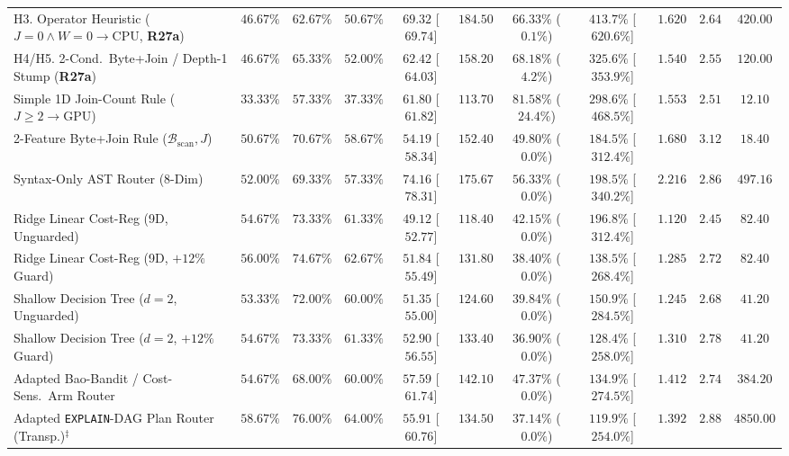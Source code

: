 \documentclass[10pt,a4paper]{article}
\newenvironment{fitasttable}{%
  \begin{lrbox}{\asttblbox}%
}{%
  \end{lrbox}%
  \sbox{\asttblboxB}{%
    \ifdim\wd\asttblbox>0.96\textwidth
      \resizebox{0.96\textwidth}{!}{\usebox{\asttblbox}}%
    \else
      \usebox{\asttblbox}%
    \fi
  }%
  \ifdim\ht\asttblboxB>0.72\textheight
    \resizebox{!}{0.72\textheight}{\usebox{\asttblboxB}}%
  \else
    \usebox{\asttblboxB}%
  \fi
}
\begin{document}
\begin{table}[!htbp]
\begin{fitasttable}
\begin{tabular}{@{}lcccccccccc@{}}
H3. Operator Heuristic ($J=0\wedge W=0\rightarrow\text{CPU}$, \textbf{R27a}) & $46.67\%$ & $62.67\%$ & $50.67\%$ & $69.32$ [$69.74$] & $184.50$ & $66.33\%$ ($0.1\%$) & $413.7\%$ [$620.6\%$] & $1.620$ & $2.64$ & $420.00$ \\
H4/H5. 2-Cond.\ Byte+Join / Depth-1 Stump (\textbf{R27a}) & $46.67\%$ & $65.33\%$ & $52.00\%$ & $62.42$ [$64.03$] & $158.20$ & $68.18\%$ ($4.2\%$) & $325.6\%$ [$353.9\%$] & $1.540$ & $2.55$ & $120.00$ \\
Simple 1D Join-Count Rule ($J \ge 2 \rightarrow \text{GPU}$) & $33.33\%$ & $57.33\%$ & $37.33\%$ & $61.80$ [$61.82$] & $113.70$ & $81.58\%$ ($24.4\%$) & $298.6\%$ [$468.5\%$] & $1.553$ & $2.51$ & $12.10$ \\
2-Feature Byte+Join Rule ($\mathcal{B}_{\text{scan}}, J$) & $50.67\%$ & $70.67\%$ & $58.67\%$ & $54.19$ [$58.34$] & $152.40$ & $49.80\%$ ($0.0\%$) & $184.5\%$ [$312.4\%$] & $1.680$ & $3.12$ & $18.40$ \\
Syntax-Only AST Router (8-Dim) & $52.00\%$ & $69.33\%$ & $57.33\%$ & $74.16$ [$78.31$] & $175.67$ & $56.33\%$ ($0.0\%$) & $198.5\%$ [$340.2\%$] & $2.216$ & $2.86$ & $497.16$ \\
Ridge Linear Cost-Reg (9D, Unguarded) & $54.67\%$ & $73.33\%$ & $61.33\%$ & $49.12$ [$52.77$] & $118.40$ & $42.15\%$ ($0.0\%$) & $196.8\%$ [$312.4\%$] & $1.120$ & $2.45$ & $82.40$ \\
Ridge Linear Cost-Reg (9D, $+12\%$ Guard) & $56.00\%$ & $74.67\%$ & $62.67\%$ & $51.84$ [$55.49$] & $131.80$ & $38.40\%$ ($0.0\%$) & $138.5\%$ [$268.4\%$] & $1.285$ & $2.72$ & $82.40$ \\
Shallow Decision Tree ($d=2$, Unguarded) & $53.33\%$ & $72.00\%$ & $60.00\%$ & $51.35$ [$55.00$] & $124.60$ & $39.84\%$ ($0.0\%$) & $150.9\%$ [$284.5\%$] & $1.245$ & $2.68$ & $41.20$ \\
Shallow Decision Tree ($d=2$, $+12\%$ Guard) & $54.67\%$ & $73.33\%$ & $61.33\%$ & $52.90$ [$56.55$] & $133.40$ & $36.90\%$ ($0.0\%$) & $128.4\%$ [$258.0\%$] & $1.310$ & $2.78$ & $41.20$ \\
Adapted Bao-Bandit / Cost-Sens.\ Arm Router & $54.67\%$ & $68.00\%$ & $60.00\%$ & $57.59$ [$61.74$] & $142.10$ & $47.37\%$ ($0.0\%$) & $134.9\%$ [$274.5\%$] & $1.412$ & $2.74$ & $384.20$ \\
Adapted \texttt{EXPLAIN}-DAG Plan Router (Transp.)$^{\ddagger}$ & $58.67\%$ & $76.00\%$ & $64.00\%$ & $55.91$ [$60.76$] & $134.50$ & $37.14\%$ ($0.0\%$) & $119.9\%$ [$254.0\%$] & $1.392$ & $2.88$ & $4850.00$ \\

\end{tabular}
\end{fitasttable}
\end{table}
\end{document}
